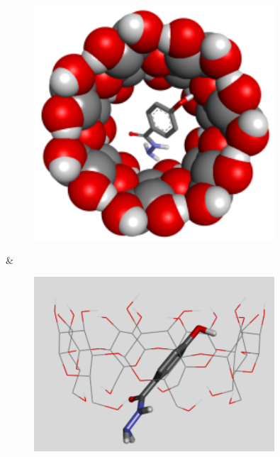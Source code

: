 \begin{figure}[H]
	\centering
	\includegraphics[width=0.8\textwidth]{media/chem2/image47}
	\caption*{}
\end{figure}
 &
\begin{figure}[H]
	\centering
	\includegraphics[width=0.8\textwidth]{media/chem2/image48}
	\caption*{}
\end{figure}
